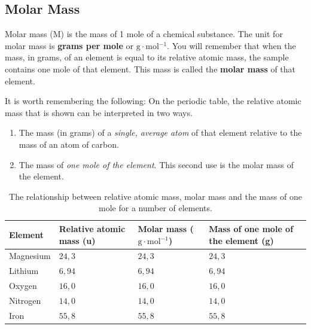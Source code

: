             \subsection*{Molar Mass}
            \nopagebreak
            \label{m38717*fhsst!!!underscore!!!id147}
 {Molar mass (M) is the mass of 1 mole of a chemical substance. The unit for molar mass is \textbf{grams per mole} or $\text{g} \cdot \text{mol}{}^{-1}$. } 
      \label{m38717*id276429}You will remember that when the mass, in grams, of an element is equal to its relative atomic mass, the sample contains one mole of that element. This mass is called the \textbf{molar mass} of that element.\par 
{} \label{m38717*id276445}It is worth remembering the following: On the periodic table, the relative atomic mass that is shown can be interpreted in two ways.
\begin{enumerate}[noitemsep, label=\textbf{\arabic*}. ] 
\item The mass (in grams) of a \textsl{single, average atom} of that element relative to the mass of an atom of carbon.
\item The mass of \textsl{one mole of the element}. This second use is the molar mass of the element.
\end{enumerate}
          \begin{table}[H]
        \begin{center}
      \label{m38717*uid11}
    \noindent
      \begin{tabular}{|l|l|l|p{3cm}|}\hline
                \textbf{Element}
               &
                \textbf{Relative atomic mass (u)}
               &
                \textbf{Molar mass ($\text{g} \cdot \text{mol}{}^{-1}$)}
               &
                \textbf{Mass of one mole of the element (g)} \\ \hline
        Magnesium &
        $24,3$ &
        $24,3$ &
        $24,3$ \\ \hline
        Lithium &
        $6,94$ &
        $6,94$ &
        $6,94$ \\ \hline
        Oxygen &
        $16,0$ &
        $16,0$ &
        $16,0$ \\ \hline
        Nitrogen &
        $14,0$ &
        $14,0$ &
        $14,0$  \\ \hline
        Iron &
        $55,8$ &
        $55,8$ &
        $55,8$ \\ \hline
    \end{tabular}
      \end{center}
    \caption{The relationship between relative atomic mass, molar mass and the mass of one mole for a number of elements.}
\end{table}

